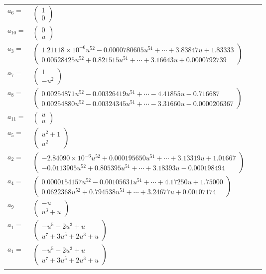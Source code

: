 \documentclass[1p]{elsarticle_modified}
\theoremstyle{definition}
\begin{document}
\begin{tabular}{m{7pt} m{180pt} m{7pt} m{180pt} }
\flushright $a_{6}=$&$\begin{pmatrix}1\\0\end{pmatrix}$ \\
\flushright $a_{10}=$&$\begin{pmatrix}0\\u\end{pmatrix}$ \\
\flushright $a_{3}=$&$\begin{pmatrix}1.21118\times10^{-6} u^{52}-0.0000780605 u^{51}+\cdots+3.83847 u+1.83333\\0.00528425 u^{52}+0.821515 u^{51}+\cdots+3.16643 u+0.0000792739\end{pmatrix}$ \\
\flushright $a_{7}=$&$\begin{pmatrix}1\\- u^2\end{pmatrix}$ \\
\flushright $a_{8}=$&$\begin{pmatrix}0.00254871 u^{52}-0.00326419 u^{51}+\cdots-4.41855 u-0.716687\\0.00254880 u^{52}-0.00324345 u^{51}+\cdots-3.31660 u-0.0000206367\end{pmatrix}$ \\
\flushright $a_{11}=$&$\begin{pmatrix}u\\u\end{pmatrix}$ \\
\flushright $a_{5}=$&$\begin{pmatrix}u^2+1\\u^2\end{pmatrix}$ \\
\flushright $a_{2}=$&$\begin{pmatrix}-2.84090\times10^{-6} u^{52}+0.000195650 u^{51}+\cdots+3.13319 u+1.01667\\-0.0113905 u^{52}+0.805395 u^{51}+\cdots+3.18393 u-0.000198494\end{pmatrix}$ \\
\flushright $a_{4}=$&$\begin{pmatrix}0.0000154157 u^{52}-0.00105631 u^{51}+\cdots+4.17250 u+1.75000\\0.0622368 u^{52}+0.794538 u^{51}+\cdots+3.24677 u+0.00107174\end{pmatrix}$ \\
\flushright $a_{9}=$&$\begin{pmatrix}- u\\u^3+u\end{pmatrix}$ \\
\flushright $a_{1}=$&$\begin{pmatrix}- u^5-2 u^3+u\\u^7+3 u^5+2 u^3+u\end{pmatrix}$\\ \flushright $a_{1}=$&$\begin{pmatrix}- u^5-2 u^3+u\\u^7+3 u^5+2 u^3+u\end{pmatrix}$\\&\end{tabular}
\end{document}
